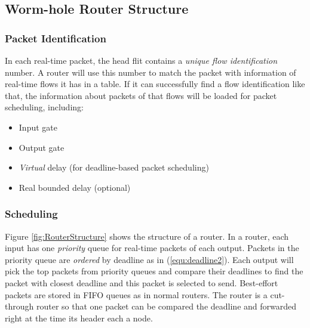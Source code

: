 \documentclass[conference, twocolumn]{IEEEtran}
\theoremstyle{definition}
\begin{document}
% 

\subsection{Worm-hole Router Structure}
\subsubsection{Packet Identification}
In each real-time packet, the head flit contains a {\em unique flow
identification} number. A router will use this number to match the packet with
information of real-time flows it has in a table. If it can successfully find a
flow identification like that, the information about packets of that flows will
be loaded  for packet scheduling, including:
\begin{itemize}
  \item Input gate
  \item Output gate
  \item {\em Virtual} delay (for deadline-based packet scheduling)
  \item Real bounded delay (optional)
\end{itemize}

\subsubsection{Scheduling}
Figure \ref{fig:RouterStructure} shows the structure of a router. In a router,
each input has one {\em priority} queue for real-time packets of each output.
Packets in the priority queue are {\em ordered} by deadline as in
(\ref{equ:deadline2}). Each output will pick the top packets from priority
queues and compare their deadlines to find the packet with closest deadline and this
packet is selected to send. Best-effort packets are stored in FIFO queues as in
normal routers. The router is a cut-through router so that one packet can be
compared the deadline and forwarded right at the time its header each a node.
\end{document}
